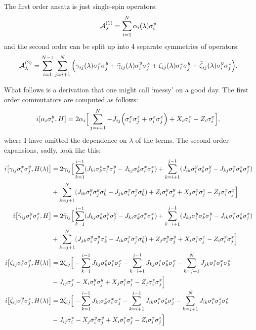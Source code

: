 The first order  ansatz is just single-spin operators:
\begin{equation}\label{eq:spin_agp_1storder}
    \mathcal{A}_{\lambda}^{(1)} = \sum_{i = 1}^N \alpha_i(\lambda) \sigma^y_i
\end{equation}
and the second order can be split up into 4 separate symmetries of operators:
\begin{equation}\label{eq:spin_agp_2ndorder}
        \mathcal{A}_{\lambda}^{(2)} = \sum_{i = 1}^{N-1}\sum_{j = i+1}^{N} \Big( \gamma_{ij}(\lambda) \sigma^x_i \sigma^y_j + \Bar{\gamma}_{ij}(\lambda) \sigma^y_i \sigma^x_j + \zeta_{ij}(\lambda) \sigma^z_i \sigma^y_j + \Bar{\zeta}_{ij}(\lambda) \sigma^y_i \sigma^z_j \Big).
\end{equation}

What follows is a derivation that one might call `messy' on a good day. The first order commutators are computed as follows:
\begin{equation}\label{eq:first_order_AGP_commutator}
        i\comm{\alpha_i \sy_i}{H} = 2\alpha_i \Big[ \sum_{j = i+1}^{N} - J_{ij} \Big( \sx_i \sz_j + \sz_i \sx_j \Big) + X_i \sz_i - Z_i \sx_i \Big],
\end{equation}
where I have omitted the dependence on $\lambda$ of the terms. The second order expansions, sadly, look like this:
\begin{equation}
    \begin{aligned}
        i\comm{\gamma_{ij} \sx_i \sy_j}{H(\lambda)} &= 2\gamma_{ij} \Big[ \sum_{k = 1}^{i-1} (J_{ki} \sz_k \sy_i \sy_j - J_{kj} \sz_k \sx_i \sx_j)  + \sum_{k = i + 1}^{j-1} (J_{ik} \sy_i \sz_k \sy_j - J_{kj} \sx_i \sz_k \sx_j) \\ 
        &+ \sum_{k = j + 1}^N (J_{ik} \sy_i \sy_j \sz_k - J_{jk} \sx_i \sx_j \sz_k) + Z_i \sy_i \sy_j + X_j \sx_i \sz_j - Z_j \sx_i \sx_j \Big] \\
        i\comm{\Bar{\gamma}_{ij} \sy_i \sx_j}{H} &= 2\Bar{\gamma}_{ij} \Big[ \sum_{k = 1}^{i-1} (J_{kj} \sz_k \sy_i \sy_j - J_{ki} \sz_k \sx_i \sx_j) + \sum_{k = i + 1}^{j-1} (J_{kj} \sy_i \sz_k \sy_j - J_{ik} \sx_i \sz_k \sx_j) \\ 
        &+ \sum_{k = j + 1}^N (J_{jk} \sy_i \sy_j \sz_k - J_{ik} \sx_i \sx_j \sz_k)+ Z_j \sy_i \sy_j + X_i \sz_i \sx_j - Z_i \sx_i \sx_j \Big] \\ 
        i\comm{\zeta_{ij} \sz_i \sy_j}{H(\lambda)} &= 2\zeta_{ij} \Big[ -\sum_{k = 1}^{i-1} J_{kj} \sz_k \sz_i \sx_j - \sum_{k = i + 1}^{j-1} J_{kj} \sz_i \sz_k \sx_j - \sum_{k = j + 1}^N J_{jk} \sz_i \sx_j \sz_k  \\
        &- J_{ij} \sx_j - X_i \sy_i \sy_j + X_j \sz_i \sz_j - Z_j \sz_i\sx_j \Big] \\
        i\comm{\Bar{\zeta}_{ij} \sy_i \sz_j}{H(\lambda)} &= 2\Bar{\zeta}_{ij} \Big[ - \sum_{k = 1}^{i-1} J_{ki} \sz_k \sx_i \sz_j - \sum_{k = i + 1}^{j-1} J_{ik} \sx_i \sz_k \sz_j 
        - \sum_{k = j + 1}^N J_{ik} \sx_i \sz_j \sz_k \\
        &- J_{ij} \sx_i - X_j \sy_i \sy_j + X_i \sz_i \sz_j - Z_i \sx_i \sz_j \Big]
    \end{aligned}
\end{equation}
